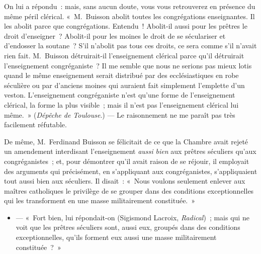 \documentclass[french,twoside]{book} %
\begin{document}
On lui a répondu : mais, sans aucun doute, vous vous retrouverez en présence du même péril clérical. « M. Buisson abolit toutes les congrégations enseignantes. Il les abolit parce que congrégations. Entendu ! Abolit-il aussi pour les prêtres le droit d’enseigner ? Abolit-il pour les moines le droit de se séculariser et d’endosser la soutane ? S’il n’abolit pas tous ces droits, ce sera comme s’il  n’avait rien fait. M. Buisson détruirait-il l’enseignement clérical parce qu’il détruirait l’enseignement congréganiste ? Il me semble que nous ne serions pas mieux lotis quand le même enseignement serait distribué par des ecclésiastiques en robe séculière ou par d’anciens moines qui auraient fait simplement l’emplette d’un veston. L’enseignement congréganiste n’est qu’une forme de l’enseignement clérical, la forme la plus visible ; mais il n’est pas l’enseignement clérical lui même. » (\emph{Dépêche de Toulouse}.) — Le raisonnement ne me paraît pas très facilement réfutable.\par
De même, M. Ferdinand Buisson se félicitait de ce que la Chambre avait rejeté un amendement interdisant l’enseignement {\itshape aussi bien} aux prêtres séculiers qu’aux congréganistes ; et, pour démontrer qu’il avait raison de se réjouir, il employait des arguments qui précisément, en s’appliquant aux congréganistes, s’appliquaient tout aussi bien aux séculiers. Il disait : « Nous voulons seulement enlever aux maîtres catholiques le privilège de se grouper dans des conditions exceptionnelles qui les transforment en une masse militairement constituée. »\par

\begin{itemize}[itemsep=0pt,]
\item  — « Fort bien, lui répondait-on (Sigismond Lacroix, {\itshape Radical}) ; mais qui ne voit que les prêtres séculiers sont, aussi eux, groupés dans des conditions  exceptionnelles, qu’ils forment eux aussi une masse militairement constituée ? »
\end{itemize}
\end{document}
